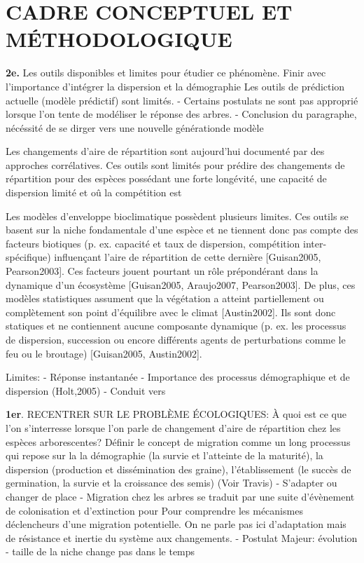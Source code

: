 \section*{\uppercase{CADRE CONCEPTUEL ET MÉTHODOLOGIQUE}}

\textbf{2e.} Les outils disponibles et limites pour étudier ce phénomène. Finir avec l'importance d'intégrer la dispersion et la démographie
Les outils de prédiction actuelle (modèle prédictif) sont limités. 
- Certains postulats ne sont pas approprié lorsque l'on tente de modéliser le réponse des arbres. 
- Conclusion du paragraphe, nécéssité de se dirger vers une nouvelle générationde modèle 

Les changements d'aire de répartition sont aujourd'hui documenté par des approches corrélatives. Ces outils sont limités pour prédire des changements de répartition pour des espèces possédant une forte longévité, une capacité de dispersion limité et oû la compétition est

Les modèles d’enveloppe bioclimatique possèdent plusieurs limites. Ces outils se basent sur la niche fondamentale d’une espèce et ne tiennent donc pas compte des facteurs biotiques (p. ex. capacité et taux de dispersion, compétition inter-spécifique) influençant l’aire de répartition de cette dernière [Guisan2005, Pearson2003]. Ces facteurs jouent pourtant un rôle prépondérant dans la dynamique d’un écosystème [Guisan2005, Araujo2007, Pearson2003]. De plus, ces modèles statistiques assument que la végétation a atteint partiellement ou complètement son point d’équilibre avec le climat [Austin2002]. Ils sont donc statiques et ne contiennent aucune composante dynamique (p. ex. les processus de dispersion, succession ou encore différents agents de perturbations comme le feu ou le broutage) [Guisan2005, Austin2002].
	
	Limites:
	- Réponse instantanée 
	- Importance des processus démographique et de dispersion (Holt,2005)
			- Conduit vers 
			
\textbf{1er}. RECENTRER SUR LE PROBLÈME ÉCOLOGIQUES:  À quoi est ce que l'on s'interresse lorsque l'on parle de changement d'aire de répartition chez les espèces arborescentes? Définir le concept de migration comme un long processus qui repose sur la la démographie (la survie et l'atteinte de la maturité), la dispersion (production et dissémination des graine), l'établissement (le succès de germination, la survie et la croissance des semis) (Voir Travis)
			- S'adapter ou changer de place 
			- Migration chez les arbres se traduit par une suite d'évènement de colonisation et d'extinction pour 
			Pour comprendre les mécanismes déclencheurs d'une migration potentielle. On ne parle pas ici d'adaptation mais de résistance et inertie du système aux changements.
			- Postulat Majeur: évolution - taille de la niche change pas dans le temps

